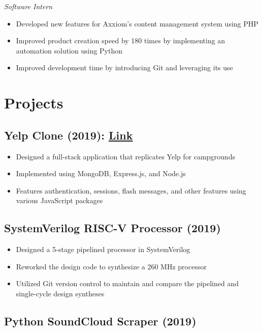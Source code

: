 \documentclass[10pt]{article}
\begin{document}
\noindent\textit{Software Intern}

\begin{itemize}
	\setlength\itemsep{0em}
	\item Developed new features for Axxiom's content management system using PHP
	\item Improved product creation speed by 180 times by implementing an automation solution using Python
	\item Improved development time by introducing Git and leveraging its use
\end{itemize}

\section{Projects}
\subsection{Yelp Clone (2019): \href{https://github.com/brandonhawi/YelpCamp}{Link}}

\begin{itemize}[leftmargin=0.6cm]
	\setlength\itemsep{0em}
	\item Designed a full-stack application that replicates Yelp for campgrounds
	\item Implemented using MongoDB, Express.js, and Node.js
	\item Features authentication, sessions, flash messages, and other features using various JavaScript packages
\end{itemize}

\subsection{SystemVerilog RISC-V Processor (2019)}

\begin{itemize}
	\setlength\itemsep{0em}
	\item Designed a 5-stage pipelined processor in SystemVerilog
	\item Reworked the design code to synthesize a 260 MHz processor
	\item Utilized Git version control to maintain and compare the pipelined and single-cycle design syntheses
\end{itemize}

\subsection{Python SoundCloud Scraper (2019)}
\end{document}
